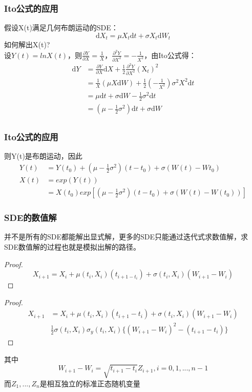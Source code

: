 \begin{frame}
\frametitle{Ito公式的应用}
\footnotesize
假设X(t)满足几何布朗运动的SDE：$$\mathrm{d}X_t = \mu X_t\mathrm{d}t + \sigma X_t\mathrm{d}W_t$$
如何解出X(t)?\\
设$Y(t) = lnX(t)$，则$\frac{\partial Y}{\partial X} = \frac{1}{X}$，$\frac{\partial^2Y}{\partial X^2} = -\frac{1}{X^2}$，由Ito公式得：
\begin{align}
\mathrm{d}Y &= \frac{\partial Y}{\partial X}\mathrm{d}X + \frac{1}{2}\frac{\partial^2Y}{\partial X^2}(\mathrm X_t)^2\\
&= \frac{1}{X}(\mu X\mathrm{d}W) + \frac{1}{2}(-\frac{1}{X^2})\sigma^2X^2\mathrm{d}t\\
&= \mu \mathrm{d}t + \sigma \mathrm{d}W - \frac{1}{2}\sigma^2\mathrm{d}t\\
&= (\mu-\frac{1}{2}\sigma^2)\mathrm{d}t + \sigma\mathrm{d}W\\
\end{align}


\end{frame}

\begin{frame}
\frametitle{Ito公式的应用}
\footnotesize
则Y(t)是布朗运动，因此
\begin{align}
Y(t) &= Y(t_0)+(\mu-\frac{1}{2}\sigma^2)(t-t_0) + \sigma(W(t)-W{t_0})\\
X(t) &= exp(Y(t))\\
&= X(t_0)exp[(\mu-\frac{1}{2}\sigma^2)(t-t_0)+\sigma(W(t)-W(t_0))]
\end{align}

\end{frame}

\begin{frame}

\frametitle{SDE的数值解}
\footnotesize

并不是所有的SDE都能解出显式解，更多的SDE只能通过迭代式求数值解，求SDE数值解的过程也就是模拟出解的路径。
\renewcommand{\proofname}{Euler格式}
\begin{proof}
$$X_{i+1} = X_i + \mu (t_i,X_i)(t_{i+1-t_i}) + \sigma(t_i,X_i)(W_{i+1}-W_i)$$
\end{proof}

\renewcommand{\proofname}{Milstein格式}
\begin{proof}
\begin{align}
X_{i+1} &= X_i + \mu (t_i,X_i)(t_{i+1}-t_i)+\sigma (t_i,X_i)(W_{i+1}-W_i)\\
&\frac{1}{2}\sigma(t_i,X_i)\sigma_y(t_i,X_i)\{(W_{i+1}-W_i)^2-(t_{i+1}-t_i)\}
\end{align}

\end{proof}

其中$$W_{i+1}-W_i = \sqrt{t_{i+1}-t_i}Z_{i+1}, i=0,1,...,n-1$$
而$Z_1,...,Z_n$是相互独立的标准正态随机变量

\end{frame}

